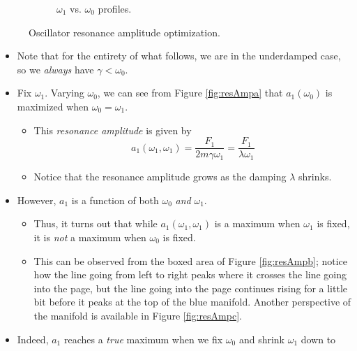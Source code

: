 \documentclass[../notes.tex]{subfiles}
\begin{document}
\begin{itemize}
\begin{figure}[h!]
\begin{subfigure}[b]{0.24\linewidth}
            \caption{$\omega_1$ vs. $\omega_0$ profiles.}
            \label{fig:resAmpd}
        \end{subfigure}
        \caption{Oscillator resonance amplitude optimization.}
        \label{fig:resAmp}
    \end{figure}
    \begin{itemize}
        \item Note that for the entirety of what follows, we are in the underdamped case, so we \emph{always} have $\gamma<\omega_0$.
        \item Fix $\omega_1$. Varying $\omega_0$, we can see from Figure \ref{fig:resAmpa} that $a_1(\omega_0)$ is maximized when $\omega_0=\omega_1$.
        \begin{itemize}
            \item This \emph{resonance amplitude} is given by
            \begin{equation*}
                a_1(\omega_1,\omega_1) = \frac{F_1}{2m\gamma\omega_1}
                = \frac{F_1}{\lambda\omega_1}
            \end{equation*}
            \item Notice that the resonance amplitude grows as the damping $\lambda$ shrinks.
        \end{itemize}
        \item However, $a_1$ is a function of both $\omega_0$ \emph{and} $\omega_1$.
        \begin{itemize}
            \item Thus, it turns out that while $a_1(\omega_1,\omega_1)$ is a maximum when $\omega_1$ is fixed, it is \emph{not} a maximum when $\omega_0$ is fixed.
            \item This can be observed from the boxed area of Figure \ref{fig:resAmpb}; notice how the line going from left to right peaks where it crosses the line going into the page, but the line going into the page continues rising for a little bit before it peaks at the top of the blue manifold. Another perspective of the manifold is available in Figure \ref{fig:resAmpc}.
        \end{itemize}
        \item Indeed, $a_1$ reaches a \emph{true} maximum when we fix $\omega_0$ and shrink $\omega_1$ down to

\end{itemize}
\end{itemize}
\end{document}
